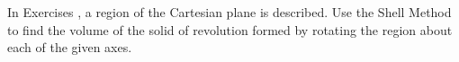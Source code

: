 {\noindent In Exercises}
{, a region of the Cartesian plane is described. Use the Shell Method to find the volume of the solid of revolution formed by rotating the region about each of the given axes.
}

